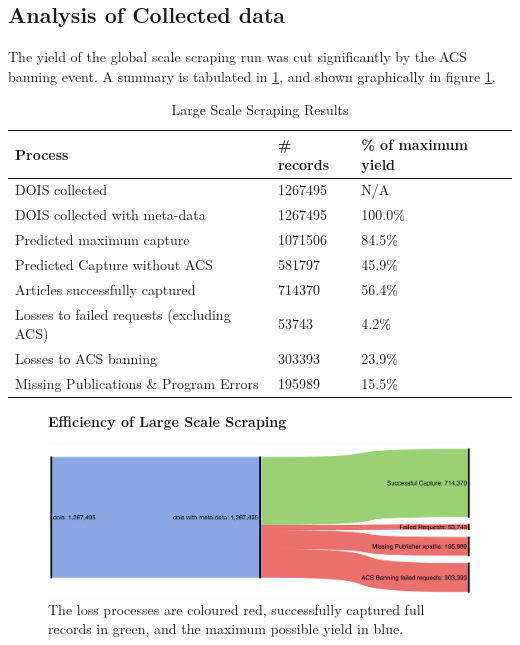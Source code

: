 \subsection{Analysis of Collected data}
The yield of the global scale scraping run was cut significantly by the ACS banning event. A summary is tabulated in \ref{tab:LARGESCRAPERES}, and shown graphically in figure \ref{fig:LARGESANK}.
\begin{table}[h!]
\caption{Large Scale Scraping Results}
\label{tab:LARGESCRAPERES}

\begin{center}
\begin{tabular}{||l|l|l||}
\hline
Process & \# records & \% of maximum yield\\
\hline
DOIS collected &  1267495 &N/A\\
DOIS collected with meta-data &  1267495 &100.0\%\\

\hline
Predicted maximum capture & 1071506 &  84.5\%\\
Predicted Capture without ACS & 581797 & 45.9\%\\
\hline
Articles successfully captured & 714370 & 56.4\%\\
Losses to failed requests (excluding ACS)& 53743 & 4.2\%\\
Losses to ACS banning & 303393 & 23.9\%\\
Missing Publications \& Program Errors & 195989 & 15.5\%\\
\hline
\end{tabular}
\end{center}
\end{table}
\begin{figure}[H]
    \centering
    \textbf{Efficiency of Large Scale Scraping}\par\medskip
    \includegraphics[width=\textwidth]{Data_Acquisition/large_sankey.png}
    \caption[Efficiency of Large Scale Scraping]{The loss processes are coloured red, successfully captured full records in green, and the maximum possible yield in blue.}
     \label{fig:LARGESANK}
\end{figure}

